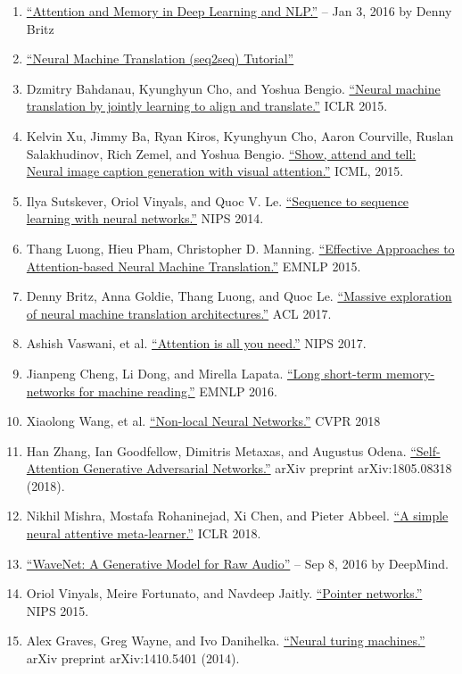 \documentclass[12pt]{article}
\begin{document}
\begin{enumerate}
    \item \href{http://www.wildml.com/2016/01/attention-and-memory-in-deep-learning-and-nlp/}{``Attention and Memory in Deep Learning and NLP.''} -- Jan 3, 2016 by Denny Britz
    \item \href{https://github.com/tensorflow/nmt}{``Neural Machine Translation (seq2seq) Tutorial''}
    \item Dzmitry Bahdanau, Kyunghyun Cho, and Yoshua Bengio. \href{https://arxiv.org/pdf/1409.0473.pdf}{``Neural machine translation by jointly learning to align and translate.''} ICLR 2015.
    \item Kelvin Xu, Jimmy Ba, Ryan Kiros, Kyunghyun Cho, Aaron Courville, Ruslan Salakhudinov, Rich Zemel, and Yoshua Bengio. \href{http://proceedings.mlr.press/v37/xuc15.pdf}{``Show, attend and tell: Neural image caption generation with visual attention.''} ICML, 2015.
    \item Ilya Sutskever, Oriol Vinyals, and Quoc V. Le. \href{https://papers.nips.cc/paper/5346-sequence-to-sequence-learning-with-neural-networks.pdf}{``Sequence to sequence learning with neural networks.''} NIPS 2014.
    \item Thang Luong, Hieu Pham, Christopher D. Manning. \href{https://arxiv.org/pdf/1508.04025.pdf}{``Effective Approaches to Attention-based Neural Machine Translation.''} EMNLP 2015.
    \item Denny Britz, Anna Goldie, Thang Luong, and Quoc Le. \href{https://arxiv.org/abs/1703.03906}{``Massive exploration of neural machine translation architectures.''} ACL 2017.
    \item Ashish Vaswani, et al. \href{http://papers.nips.cc/paper/7181-attention-is-all-you-need.pdf}{``Attention is all you need.''} NIPS 2017.
    \item Jianpeng Cheng, Li Dong, and Mirella Lapata. \href{https://arxiv.org/pdf/1601.06733.pdf}{``Long short-term memory-networks for machine reading.''} EMNLP 2016.
    \item Xiaolong Wang, et al. \href{https://arxiv.org/pdf/1711.07971.pdf}{``Non-local Neural Networks.''} CVPR 2018
    \item Han Zhang, Ian Goodfellow, Dimitris Metaxas, and Augustus Odena. \href{https://arxiv.org/pdf/1805.08318.pdf}{``Self-Attention Generative Adversarial Networks.''} arXiv preprint arXiv:1805.08318 (2018).
    \item Nikhil Mishra, Mostafa Rohaninejad, Xi Chen, and Pieter Abbeel. \href{https://arxiv.org/abs/1707.03141}{``A simple neural attentive meta-learner.''} ICLR 2018.
    \item \href{https://deepmind.com/blog/wavenet-generative-model-raw-audio/}{``WaveNet: A Generative Model for Raw Audio''} -- Sep 8, 2016 by DeepMind.
    \item Oriol Vinyals, Meire Fortunato, and Navdeep Jaitly. \href{https://arxiv.org/abs/1506.03134}{``Pointer networks.''} NIPS 2015.
    \item Alex Graves, Greg Wayne, and Ivo Danihelka. \href{https://arxiv.org/abs/1410.5401}{``Neural turing machines.''} arXiv preprint arXiv:1410.5401 (2014).
\end{enumerate}
  
\end{document}
